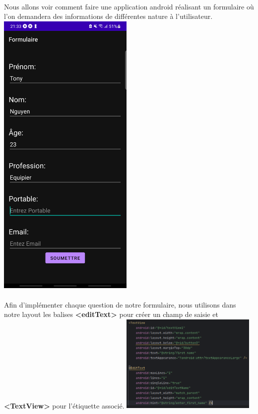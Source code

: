 \documentclass[a4paper]{article}
\begin{document}
\begin{multicols}{2}
  \paragraph{}
  Nous allons voir comment faire une application android réalisant un formulaire où l'on demandera des informations de différentes nature à l'utilisateur.
  \includegraphics[width=0.49\textwidth]{screenshotFormulaireIncomplet}
  \paragraph{}
  Afin d'implémenter chaque question de notre formulaire, nous utilisons dans notre layout les balises \textbf{<editText>} pour créer un champ de saisie et \textbf{<TextView>} pour l'étiquette associé.
  \includegraphics[width=0.49\textwidth]{screenshotFormulaireLayout}


\end{multicols}
\end{document}
